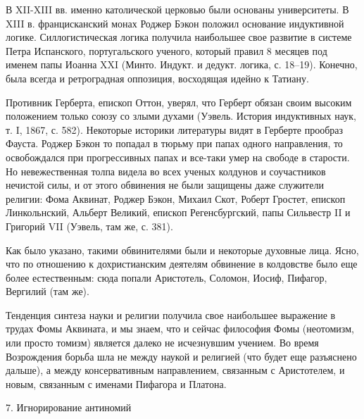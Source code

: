 В XII-XIII вв. именно католической церковью были основаны университеты. В XIII
в. францисканский монах Роджер Бэкон положил основание индуктивной логике.
Силлогистическая логика получила наибольшее свое развитие в системе Петра
Испанского, португальского ученого, который правил 8 месяцев под именем папы
Иоанна XXI (Минто. Индукт. и дедукт. логика, с. 18--19). Конечно, была всегда и
ретроградная оппозиция, восходящая идейно к Татиану.

Противник Герберта, епископ Оттон, уверял, что Герберт обязан своим высоким
положением только союзу со злыми духами (Уэвель. История индуктивных наук, т.
I, 1867, с. 582). Некоторые историки литературы видят в Герберте прообраз
Фауста. Роджер Бэкон то попадал в тюрьму при папах одного направления, то
освобождался при прогрессивных папах и все-таки умер на свободе в старости. Но
невежественная толпа видела во всех ученых колдунов и соучастников нечистой
силы, и от этого обвинения не были защищены даже служители религии: Фома
Аквинат, Роджер Бэкон, Михаил Скот, Роберт Гростет, епископ Линкольнский,
Альберт Великий, епископ Регенсбургский, папы Сильвестр II и Григорий VII
(Уэвель, там же, с. 381).

Как было указано, такими обвинителями были и некоторые духовные лица. Ясно, что
по отношению к дохристианским деятелям обвинение в колдовстве было еще более
естественным: сюда попали Аристотель, Соломон, Иосиф, Пифагор, Вергилий (там
же).

Тенденция синтеза науки и религии получила свое наибольшее выражение в трудах
Фомы Аквината, и мы знаем, что и сейчас философия Фомы (неотомизм, или просто
томизм) является далеко не исчезнувшим учением. Во время Возрождения борьба шла
не между наукой и религией (что будет еще разъяснено дальше), а между
консервативным направлением, связанным с Аристотелем, и новым, связанным с
именами Пифагора и Платона.

7. Игнорирование антиномий

